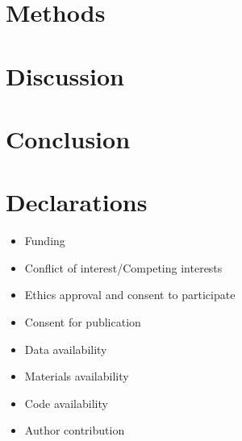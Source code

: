 \documentclass[pdflatex,sn-mathphys-num]{sn-jnl}    %
\theoremstyle{thmstyleone}%
\theoremstyle{thmstyletwo}%
\theoremstyle{thmstylethree}%
\begin{document}

\section{Methods}\label{sec:methods}


\section{Discussion}\label{sec:discussion}

\section{Conclusion}\label{sec:conclusion}

\backmatter



\section*{Declarations}

\begin{itemize}
\item Funding
\item Conflict of interest/Competing interests
\item Ethics approval and consent to participate
\item Consent for publication
\item Data availability
\item Materials availability
\item Code availability
\item Author contribution
\end{itemize}
\end{document}
